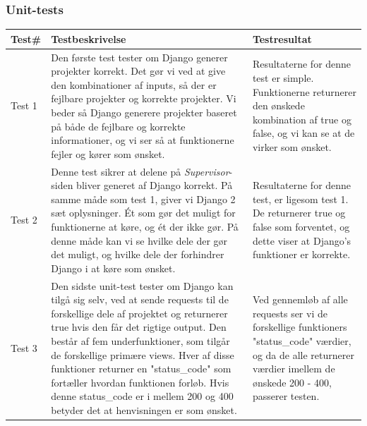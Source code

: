 \documentclass[12pt]{article}
\begin{document}
\subsubsection*{Unit-tests}
\begin{center}
	\begin{tabular}{|p{}|p{}|p{}|}
		\hline
	\textbf{Test\#} & \textbf{Testbeskrivelse} & \textbf{Testresultat} \\ \hline

	Test 1 & Den første test tester om Django generer projekter korrekt. Det gør vi ved at give den kombinationer af inputs, så der er fejlbare projekter og korrekte projekter. Vi beder så Django generere projekter baseret på både de fejlbare og korrekte informationer, og vi ser så at funktionerne fejler og kører som ønsket. & Resultaterne for denne test er simple. Funktionerne returnerer den ønskede kombination af true og false, og vi kan se at de virker som ønsket.  \\ \hline

	Test 2 & Denne test sikrer at delene på \textit{Supervisor}-siden bliver generet af Django korrekt. På samme måde som test 1, giver vi Django 2 sæt oplysninger. Ét som gør det muligt for funktionerne at køre, og ét der ikke gør. På denne måde kan vi se hvilke dele der gør det muligt, og hvilke dele der forhindrer Django i at køre som ønsket. &  Resultaterne for denne test, er ligesom test 1. De returnerer true og false som forventet, og dette viser at Django's funktioner er korrekte. \\ \hline

	Test 3 & Den sidste unit-test tester om Django kan tilgå sig selv, ved at sende requests til de forskellige dele af projektet og returnerer true hvis den får det rigtige output. Den består af fem underfunktioner, som tilgår de forskellige primære views. Hver af disse funktioner returner en "status\_code" som fortæller hvordan funktionen forløb. Hvis denne status\_code er i mellem 200 og 400 betyder det at henvisningen er som ønsket. & Ved gennemløb af alle requests ser vi de forskellige funktioners "status\_code" værdier, og da de alle returnerer værdier imellem de ønskede 200 - 400, passerer testen. \\ \hline
	\end{tabular}

\end{center}
\end{document}
